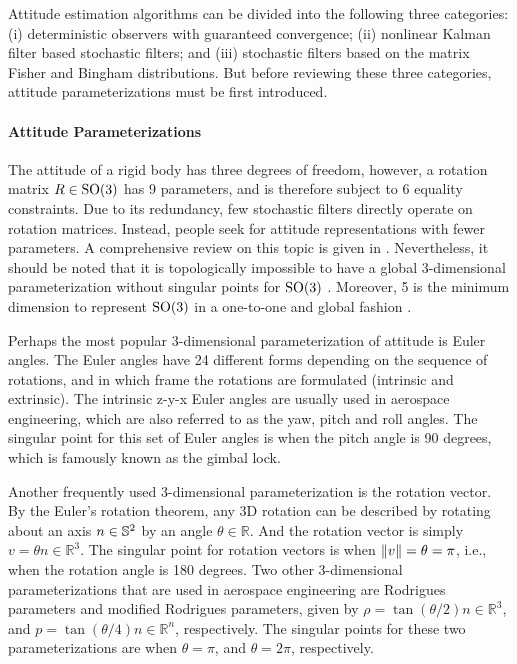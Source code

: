 Attitude estimation algorithms can be divided into the following three categories:
(i) deterministic observers with guaranteed convergence;
(ii) nonlinear Kalman filter based stochastic filters;
and (iii) stochastic filters based on the matrix Fisher and Bingham distributions.
But before reviewing these three categories, attitude parameterizations must be first introduced.

\paragraph{Attitude Parameterizations}

The attitude of a rigid body has three degrees of freedom, however, a rotation matrix $R\in\mathrm{SO}(3)$ has 9 parameters, and is therefore subject to 6 equality constraints.
Due to its redundancy, few stochastic filters directly operate on rotation matrices.
Instead, people seek for attitude representations with fewer parameters.
A comprehensive review on this topic is given in \cite{shuster1993survey}.
Nevertheless, it should be noted that it is topologically impossible to have a global 3-dimensional parameterization without singular points for $\mathrm{SO}(3)$ \cite{stuelpnagel1964parametrization}.
Moreover, 5 is the minimum dimension to represent $\mathrm{SO}(3)$ in a one-to-one and global fashion \cite{stuelpnagel1964parametrization}.

Perhaps the most popular 3-dimensional parameterization of attitude is Euler angles.
The Euler angles have 24 different forms depending on the sequence of rotations, and in which frame the rotations are formulated (intrinsic and extrinsic).
The intrinsic z-y-x Euler angles are usually used in aerospace engineering, which are also referred to as the yaw, pitch and roll angles.
The singular point for this set of Euler angles is when the pitch angle is 90 degrees, which is famously known as the gimbal lock.

Another frequently used 3-dimensional parameterization is the rotation vector.
By the Euler's rotation theorem, any 3D rotation can be described by rotating about an axis $n\in\mathbb{S}^2$ by an angle $\theta\in\mathbb{R}$.
And the rotation vector is simply $v = \theta n \in \mathbb{R}^3$.
The singular point for rotation vectors is when $\left\| v \right\| = \theta = \pi$, i.e., when the rotation angle is 180 degrees.
Two other 3-dimensional parameterizations that are used in aerospace engineering are Rodrigues parameters and modified Rodrigues parameters, given by $\rho = \tan(\theta/2) n \in \mathbb{R}^3$, and $p = \tan(\theta/4) n \in \mathbb{R}^n$, respectively.
The singular points for these two parameterizations are when $\theta = \pi$, and $\theta = 2\pi$, respectively.

